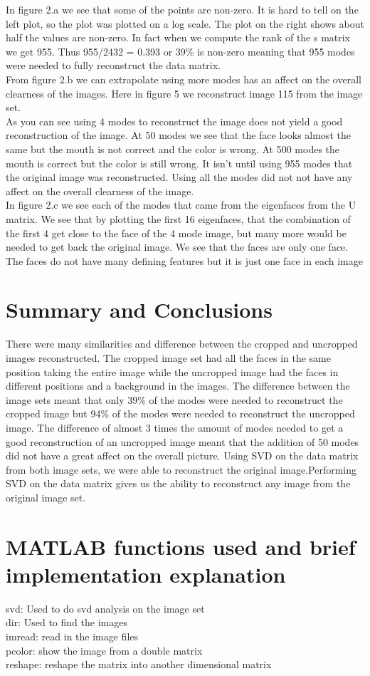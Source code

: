 \documentclass[]{article}
\begin{document}
In figure 2.a we see that some of the points are non-zero. It is hard to tell on the left plot, so the plot was plotted on a log scale. The plot on the right shows about half the values are non-zero. In fact when we compute the rank of the s matrix we get 955. Thus 955/2432 = 0.393 or 39\% is non-zero meaning that 955 modes were needed to fully reconstruct the data matrix. \\
From figure 2.b we can extrapolate using more modes has an affect on the overall clearness of the images. Here in figure 5 we reconstruct image 115 from the image set.\\
As you can see using 4 modes to reconstruct the image does not yield a good reconstruction of the image. At 50 modes we see that the face looks almost the same but the mouth is not correct and the color is wrong. At 500 modes the mouth is correct but the color is still wrong. It isn't until using 955 modes that the original image was reconstructed. Using all the modes did not not have any affect on the overall clearness of the image.\\
In figure 2.c we see each of the modes that came from the eigenfaces from the U matrix. We see that by plotting the first 16 eigenfaces, that the combination of the first 4 get close to the face of the 4 mode image, but many more would be needed to get back the original image.
We see that the faces are only one face. The faces do not have many defining features but it is just one face in each image
\section{Summary and Conclusions}
There were many similarities and difference between the cropped and uncropped images reconstructed. The cropped image set had all the faces in the same position taking the entire image while the uncropped image had the faces in different positions and a background in the images. The difference between the image sets meant that only 39\% of the modes were needed to reconstruct the cropped image but 94\% of the modes were needed to reconstruct the uncropped image. The difference of almost 3 times the amount of modes needed to get a good reconstruction of an uncropped image meant that the addition of 50 modes did not have a great affect on the overall picture. Using SVD on the data matrix from both image sets, we were able to reconstruct the original image.Performing SVD on the data matrix gives us the ability to reconstruct any image from the original image set. 
\section{ MATLAB functions used and brief implementation explanation }
svd: Used to do svd analysis on the image set\\
dir: Used to find the images\\
imread: read in the image files\\
pcolor: show the image from a double matrix\\
reshape: reshape the matrix into another dimensional matrix
\end{document}
